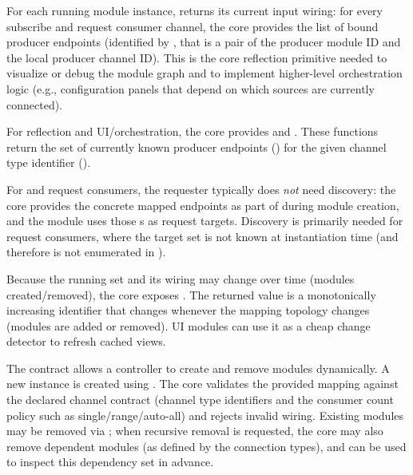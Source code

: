 For each running module instance,  returns its current input wiring: for every subscribe and request consumer channel, the core provides the list of bound producer endpoints (identified by , that is a pair of the producer module ID and the local producer channel ID). This is the core reflection primitive needed to visualize or debug the module graph and to implement higher-level orchestration logic (e.g., configuration panels that depend on which sources are currently connected).

For reflection and UI/orchestration, the core provides
 and
.
These functions return the set of currently known producer endpoints () for the given channel type identifier ().

For  and  request consumers, the requester typically does \emph{not} need discovery: the core provides the concrete mapped endpoints as part of  during module creation, and the module uses those s as request targets.
Discovery is primarily needed for  request consumers, where the target set is not known at instantiation time (and therefore is not enumerated in ).

Because the running set and its wiring may change over time (modules created/removed), the core exposes . The returned value is a monotonically increasing identifier that changes whenever the mapping topology changes (modules are added or removed). UI modules can use it as a cheap change detector to refresh cached views.

The contract allows a controller to create and remove modules dynamically. A new instance is created using . The core validates the provided mapping against the declared channel contract (channel type identifiers and the consumer count policy such as single/range/auto-all) and rejects invalid wiring. Existing modules may be removed via ; when recursive removal is requested, the core may also remove dependent modules (as defined by the connection types), and  can be used to inspect this dependency set in advance.

